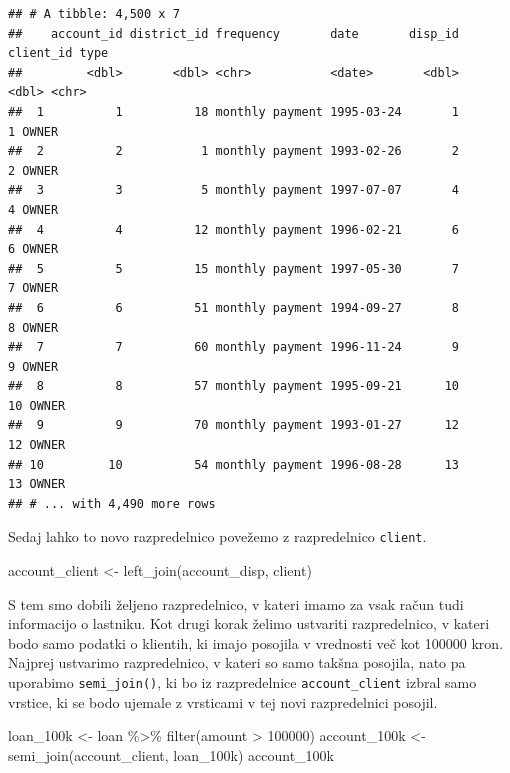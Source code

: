\documentclass[
]{book}
\newenvironment{Shaded}{\begin{snugshade}}{\end{snugshade}}
\newcommand{\DecValTok}[1]{\textcolor[rgb]{0.00,0.00,0.81}{#1}}
\newcommand{\FunctionTok}[1]{\textcolor[rgb]{0.00,0.00,0.00}{#1}}
\newcommand{\NormalTok}[1]{#1}
\newcommand{\OtherTok}[1]{\textcolor[rgb]{0.56,0.35,0.01}{#1}}
\newcommand{\SpecialCharTok}[1]{\textcolor[rgb]{0.00,0.00,0.00}{#1}}
\begin{document}
\begin{verbatim}
## # A tibble: 4,500 x 7
##    account_id district_id frequency       date       disp_id client_id type 
##         <dbl>       <dbl> <chr>           <date>       <dbl>     <dbl> <chr>
##  1          1          18 monthly payment 1995-03-24       1         1 OWNER
##  2          2           1 monthly payment 1993-02-26       2         2 OWNER
##  3          3           5 monthly payment 1997-07-07       4         4 OWNER
##  4          4          12 monthly payment 1996-02-21       6         6 OWNER
##  5          5          15 monthly payment 1997-05-30       7         7 OWNER
##  6          6          51 monthly payment 1994-09-27       8         8 OWNER
##  7          7          60 monthly payment 1996-11-24       9         9 OWNER
##  8          8          57 monthly payment 1995-09-21      10        10 OWNER
##  9          9          70 monthly payment 1993-01-27      12        12 OWNER
## 10         10          54 monthly payment 1996-08-28      13        13 OWNER
## # ... with 4,490 more rows
\end{verbatim}

Sedaj lahko to novo razpredelnico povežemo z razpredelnico \texttt{client}.

\begin{Shaded}
\begin{Highlighting}[]
\NormalTok{account\_client }\OtherTok{\textless{}{-}} \FunctionTok{left\_join}\NormalTok{(account\_disp, client)}
\end{Highlighting}
\end{Shaded}

S tem smo dobili željeno razpredelnico, v kateri imamo za vsak račun tudi informacijo o lastniku. Kot drugi korak želimo ustvariti razpredelnico, v kateri bodo samo podatki o klientih, ki imajo posojila v vrednosti več kot 100000 kron. Najprej ustvarimo razpredelnico, v kateri so samo takšna posojila, nato pa uporabimo \texttt{semi\_join()}, ki bo iz razpredelnice \texttt{account\_client} izbral samo vrstice, ki se bodo ujemale z vrsticami v tej novi razpredelnici posojil.

\begin{Shaded}
\begin{Highlighting}[]
\NormalTok{loan\_100k }\OtherTok{\textless{}{-}}\NormalTok{ loan }\SpecialCharTok{\%\textgreater{}\%}
  \FunctionTok{filter}\NormalTok{(amount }\SpecialCharTok{\textgreater{}} \DecValTok{100000}\NormalTok{)}
\NormalTok{account\_100k }\OtherTok{\textless{}{-}} \FunctionTok{semi\_join}\NormalTok{(account\_client, loan\_100k)}
\NormalTok{account\_100k}
\end{Highlighting}
\end{Shaded}
\end{document}
